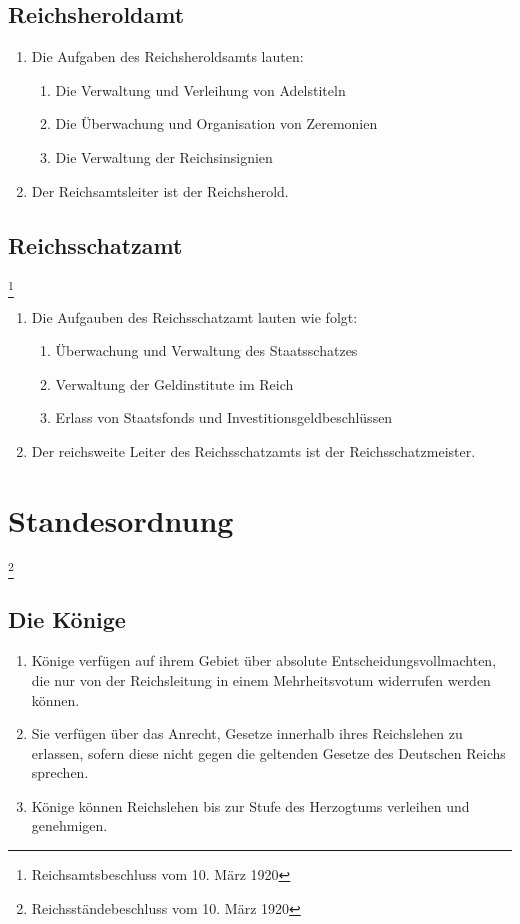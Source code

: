 \documentclass{article}
\begin{document}
\subsection{Reichsheroldamt}
\begin{enumerate}[(1)]
    \item Die Aufgaben des Reichsheroldsamts lauten:
    \begin{enumerate}[1.]
        \item Die Verwaltung und Verleihung von Adelstiteln
        \item Die Überwachung und Organisation von Zeremonien
        \item Die Verwaltung der Reichsinsignien
    \end{enumerate}
    \item Der Reichsamtsleiter ist der Reichsherold.
\end{enumerate}

\subsection{Reichsschatzamt}\footnote{Reichsamtsbeschluss vom 10. März 1920}
\begin{enumerate}[(1)]
    \item Die Aufgauben des Reichsschatzamt lauten wie folgt:
    \begin{enumerate}[1.]
        \item Überwachung und Verwaltung des Staatsschatzes
        \item Verwaltung der Geldinstitute im Reich
        \item Erlass von Staatsfonds und Investitionsgeldbeschlüssen
    \end{enumerate}
    \item Der reichsweite Leiter des Reichsschatzamts ist der Reichsschatzmeister.
\end{enumerate}

\section{Standesordnung}\footnote{Reichsständebeschluss vom 10. März 1920}
\subsection{Die Könige}
\begin{enumerate}[(1)]
    \item Könige verfügen auf ihrem Gebiet über absolute Entscheidungsvollmachten, die nur von der Reichsleitung in einem Mehrheitsvotum widerrufen werden können.
    \item Sie verfügen über das Anrecht, Gesetze innerhalb ihres Reichslehen zu erlassen, sofern diese nicht gegen die geltenden Gesetze des Deutschen Reichs sprechen.
    \item Könige können Reichslehen bis zur Stufe des Herzogtums verleihen und genehmigen.
\end{enumerate}
\end{document}
